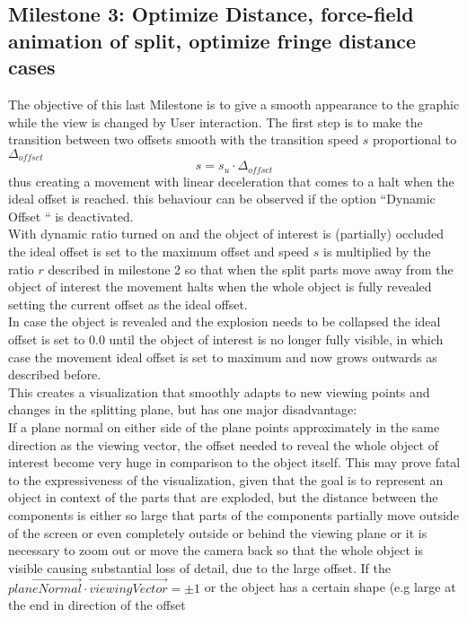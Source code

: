 \subsection{Milestone 3: Optimize Distance, force-field animation of split, optimize fringe distance cases} 

The objective of this last Milestone is to give a smooth appearance to the graphic while the view is changed by User interaction. The first step is to make the transition between two offsets smooth with the transition speed $s$ proportional to $\Delta_{offset}$
\begin{equation}
	s=s_u \cdot \Delta_{offset}
\end{equation}
thus creating a movement with linear deceleration that comes to a halt when the ideal offset is reached. this behaviour can be observed if the option ``Dynamic Offset `` is deactivated.\\
With dynamic ratio turned on and the object of interest is (partially) occluded the ideal offset is set to the maximum  offset and speed $s$ is multiplied by the ratio $r$ described in milestone 2 so that when the split parts move away from the object of interest the movement halts when the whole object is fully revealed setting the current offset as the ideal offset.\\
In case the object is revealed and the explosion needs to be collapsed the ideal offset is set to 0.0 until the object of interest is no longer fully visible, in which case the movement ideal offset is set to maximum and now grows outwards as described before.\\
This creates a visualization that smoothly adapts to new viewing points and changes in the splitting plane, but has one major disadvantage:\\
If a plane normal on either side of the plane points approximately in the same direction as the viewing vector,  the offset needed to reveal the whole object of interest become very huge in comparison to the object itself. This may prove fatal to the expressiveness of the visualization, given that the goal is to represent an object in context of the parts that are exploded, but the distance between the components is either so large that parts of the components partially move outside of the screen or even completely outside or behind the viewing plane or it is necessary to zoom out or move the camera back so that the whole object is visible causing substantial loss of detail, due to the large offset. If the $\vec{planeNormal} \cdot \vec{viewingVector} = \pm1$ or the object has a certain shape (e.g large at the end in direction of the offset
